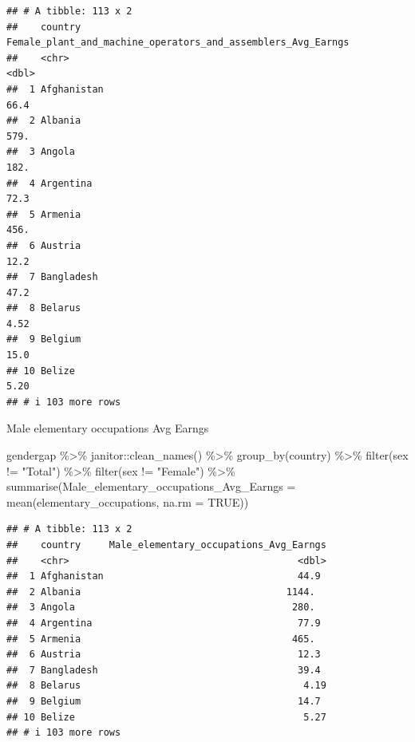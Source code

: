 \documentclass[
]{article}
\newenvironment{Shaded}{\begin{snugshade}}{\end{snugshade}}
\newcommand{\AttributeTok}[1]{\textcolor[rgb]{0.77,0.63,0.00}{#1}}
\newcommand{\ConstantTok}[1]{\textcolor[rgb]{0.00,0.00,0.00}{#1}}
\newcommand{\FunctionTok}[1]{\textcolor[rgb]{0.00,0.00,0.00}{#1}}
\newcommand{\NormalTok}[1]{#1}
\newcommand{\SpecialCharTok}[1]{\textcolor[rgb]{0.00,0.00,0.00}{#1}}
\newcommand{\StringTok}[1]{\textcolor[rgb]{0.31,0.60,0.02}{#1}}
\begin{document}
\begin{verbatim}
## # A tibble: 113 x 2
##    country     Female_plant_and_machine_operators_and_assemblers_Avg_Earngs
##    <chr>                                                              <dbl>
##  1 Afghanistan                                                        66.4 
##  2 Albania                                                           579.  
##  3 Angola                                                            182.  
##  4 Argentina                                                          72.3 
##  5 Armenia                                                           456.  
##  6 Austria                                                            12.2 
##  7 Bangladesh                                                         47.2 
##  8 Belarus                                                             4.52
##  9 Belgium                                                            15.0 
## 10 Belize                                                              5.20
## # i 103 more rows
\end{verbatim}

Male elementary occupations Avg Earngs

\begin{Shaded}
\begin{Highlighting}[]
\NormalTok{gendergap }\SpecialCharTok{\%\textgreater{}\%}
\NormalTok{  janitor}\SpecialCharTok{::}\FunctionTok{clean\_names}\NormalTok{() }\SpecialCharTok{\%\textgreater{}\%}
  \FunctionTok{group\_by}\NormalTok{(country) }\SpecialCharTok{\%\textgreater{}\%} 
   \FunctionTok{filter}\NormalTok{(sex }\SpecialCharTok{!=} \StringTok{"Total"}\NormalTok{) }\SpecialCharTok{\%\textgreater{}\%}
  \FunctionTok{filter}\NormalTok{(sex }\SpecialCharTok{!=} \StringTok{"Female"}\NormalTok{) }\SpecialCharTok{\%\textgreater{}\%}
  \FunctionTok{summarise}\NormalTok{(}\AttributeTok{Male\_elementary\_occupations\_Avg\_Earngs =} \FunctionTok{mean}\NormalTok{(elementary\_occupations, }\AttributeTok{na.rm =} \ConstantTok{TRUE}\NormalTok{))}
\end{Highlighting}
\end{Shaded}

\begin{verbatim}
## # A tibble: 113 x 2
##    country     Male_elementary_occupations_Avg_Earngs
##    <chr>                                        <dbl>
##  1 Afghanistan                                  44.9 
##  2 Albania                                    1144.  
##  3 Angola                                      280.  
##  4 Argentina                                    77.9 
##  5 Armenia                                     465.  
##  6 Austria                                      12.3 
##  7 Bangladesh                                   39.4 
##  8 Belarus                                       4.19
##  9 Belgium                                      14.7 
## 10 Belize                                        5.27
## # i 103 more rows
\end{verbatim}
\end{document}
